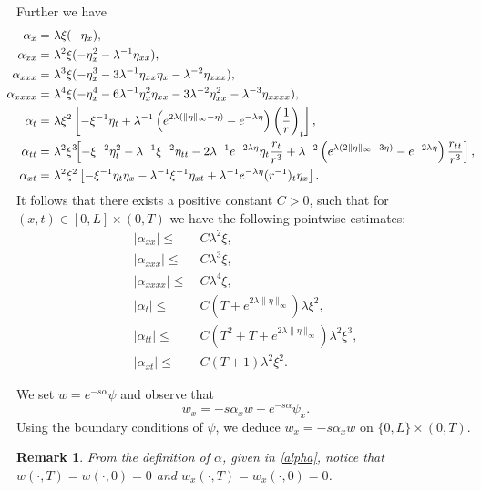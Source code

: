 \documentclass[10pt]{article}
\newtheorem{rmq}{Remark}
\def\\Phivec{\mathbf{\Phi}}
\begin{document}
\begin{appendix}
	Further we have
\begin{equation}\label{eq:alpha_deriv}
\!\!\!\!\!\!
\begin{alignedat}{2}
	\alpha_x =&~\lambda\xi(-\eta_x),~ \\
	\alpha_{xx}=&~\lambda^2\xi(-\eta_x^2 -\lambda^{-1}\eta_{xx}),\\
	\alpha_{xxx}=&~\lambda^3\xi(- \eta_x^3 - 3\lambda^{-1} \eta_{xx}\eta_x-\lambda^{-2}\eta_{xxx}),\\
	\alpha_{xxxx}=&~\lambda^4\xi(- \eta_x^4 - 6\lambda^{-1}\eta_x^2\eta_{xx}- 3\lambda^{-2}\eta_{xx}^2
	-\lambda^{-3}\eta_{xxxx}),\\
	\alpha_t =&~\lambda\xi^2\left[-\xi^{-1}\eta_t+\lambda^{-1}\left(e^{2\lambda(\|\eta\|_\infty-\eta)}-e^{-\lambda\eta}\right)\left({1\over r} \right)_t\right],\\
	\alpha_{tt}=&~\lambda^2\xi^3\!\!\left[-\xi^{-2}\eta^2_t-\lambda^{-1}\xi^{-2}\eta_{tt}
	-2\lambda^{-1}e^{-2\lambda\eta}\eta_t{r_{t}\over r^3}+\lambda^{-2}\left(e^{\lambda(2\|\eta\|_\infty-3\eta)}-e^{-2\lambda\eta}\right)
	{r_{tt}\over r^3}\right],\\
	\alpha_{xt} =&~\lambda^2\xi^2\left[-\xi^{-1}\eta_t\eta_x-\lambda^{-1}\xi^{-1}\eta_{xt}+\lambda^{-1}e^{-\lambda\eta}(r^{-1})_t \eta_x\right].
	\end{alignedat}
\end{equation}
	It follows that there exists a positive constant $C>0$, such that for $(x,t)\in [0,L]\times(0,T)$
	we have the following pointwise estimates:
\begin{equation}\label{eq:alpha_esti}
\begin{alignedat}{2}
	|\alpha_{xx}|\leq&~C\lambda^2\xi,\\
	|\alpha_{xxx}|\leq&~C\lambda^3\xi,\\
	|\alpha_{xxxx}|\leq&~C\lambda^4\xi,\\
	|\alpha_t| \leq&~C(T+e^{2\lambda\|\eta\|_\infty})\lambda\xi^2,\\
	|\alpha_{tt}| \leq&~C(T^2+T+e^{2\lambda\|\eta\|_\infty})\lambda^2\xi^3,\\
	|\alpha_{xt}| \leq&~C(T+1)\lambda^2\xi^2.
	\end{alignedat}
\end{equation}
	
	We set $w=e^{-s\alpha}\psi$ and observe that
$$
	w_x=-s\alpha_xw+e^{-s\alpha}\psi_x.
$$
	Using the boundary conditions of $\psi$, we deduce $w_x=-s \alpha_x w $ on $\{0,L\}\times(0,T)$.
\begin{rmq}\label{rmk:initialcondition}
	From the definition of $\alpha$, given in \eqref{alpha}, notice that
	$w(\cdot,T)=w(\cdot,0)=0$ and $w_x(\cdot,T)=w_x(\cdot,0)=0$.
\end{rmq}		
	

\end{appendix}
\end{document}
